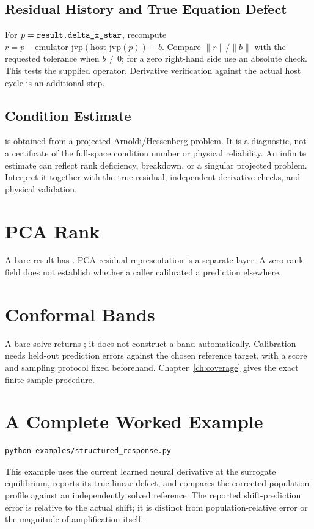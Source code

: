 \subsection{Residual History and True Equation Defect}
\label{sec:residual-history}
For $p=\texttt{result.delta\_x\_star}$, recompute
$r=p-\mathrm{emulator\_jvp}(\mathrm{host\_jvp}(p))-b$.
Compare $\|r\|/\|b\|$ with the requested tolerance when $b\ne0$; for a
zero right-hand side use an absolute check. This tests the supplied operator.
Derivative verification against the actual host cycle is an additional step.
\subsection{Condition Estimate}
\label{sec:condition}
 is obtained from a projected Arnoldi/Hessenberg
problem. It is a diagnostic, not a certificate of the full-space condition
number or physical reliability. An infinite estimate can reflect rank deficiency,
breakdown, or a singular projected problem. Interpret it together with the
true residual, independent derivative checks, and physical validation.

\section{PCA Rank}
\label{sec:pca-rank}
A bare  result has .
PCA residual representation is a separate layer. A zero rank field does not
establish whether a caller calibrated a prediction elsewhere.

\section{Conformal Bands}
\label{sec:conformal}
A bare solve returns ; it does not construct
a band automatically. Calibration needs held-out prediction errors against the
chosen reference target, with a score and sampling protocol fixed beforehand.
Chapter~\ref{ch:coverage} gives the exact finite-sample procedure.

\section{A Complete Worked Example}
\label{sec:worked-complete}
\begin{lstlisting}[style=grailInStyle]
python examples/structured_response.py
\end{lstlisting}
This example uses the current learned neural derivative at the surrogate
equilibrium, reports its true linear defect, and compares the corrected
population profile against an independently solved reference. The reported
shift-prediction error is relative to the actual shift; it is distinct from
population-relative error or the magnitude of amplification itself.
